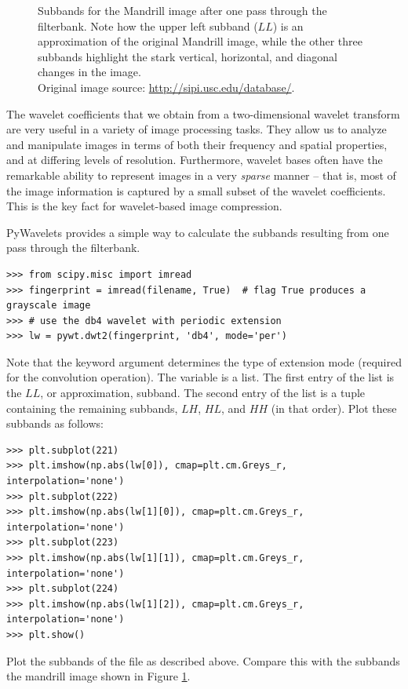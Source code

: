 \begin{figure}
\begin{subfigure}{0.4\textwidth}
       \end{subfigure}
    \caption{Subbands for the Mandrill image after one pass through the filterbank.
    Note how the upper left subband ($LL$) is an approximation of the original Mandrill image, while the other
    three subbands highlight the stark vertical, horizontal, and diagonal changes in the image.\\
    Original image source: \url{http://sipi.usc.edu/database/}.}
    \label{fig:dwt2D}
\end{figure}
The wavelet coefficients that we obtain from a two-dimensional wavelet transform are very useful in a variety of image processing tasks.
They allow us to analyze and manipulate images in terms of both their
frequency and spatial properties, and at differing levels of resolution.
Furthermore, wavelet bases often have the remarkable ability to represent
images in a very \textit{sparse} manner -- that is, most of the image
information is captured by a small subset of the wavelet coefficients.
This is the key fact for wavelet-based image compression.

PyWavelets provides a simple way to calculate the subbands resulting from one pass through the filterbank.
\begin{lstlisting}
>>> from scipy.misc import imread
>>> fingerprint = imread(filename, True)  # flag True produces a grayscale image
>>> # use the db4 wavelet with periodic extension
>>> lw = pywt.dwt2(fingerprint, 'db4', mode='per')
\end{lstlisting}
Note that the  keyword argument determines the type of extension mode (required for the convolution
operation).
The variable  is a list. The first entry of the list is the $LL$, or approximation, subband.
The second entry of the list is a tuple containing the remaining subbands, $LH$, $HL$, and $HH$ (in that order).
Plot these subbands as follows:
\begin{lstlisting}
>>> plt.subplot(221)
>>> plt.imshow(np.abs(lw[0]), cmap=plt.cm.Greys_r, interpolation='none')
>>> plt.subplot(222)
>>> plt.imshow(np.abs(lw[1][0]), cmap=plt.cm.Greys_r, interpolation='none')
>>> plt.subplot(223)
>>> plt.imshow(np.abs(lw[1][1]), cmap=plt.cm.Greys_r, interpolation='none')
>>> plt.subplot(224)
>>> plt.imshow(np.abs(lw[1][2]), cmap=plt.cm.Greys_r, interpolation='none')
>>> plt.show()
\end{lstlisting}

\begin{problem}
Plot the subbands of the file  as described above.
Compare this with the subbands the mandrill image shown in Figure \ref{fig:dwt2D}.
\end{problem}

